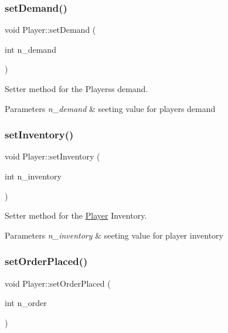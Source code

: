 \subsubsection{\texorpdfstring{set\+Demand()}{setDemand()}}
{\footnotesize\ttfamily void Player\+::set\+Demand (\begin{DoxyParamCaption}\item[{int}]{n\+\_\+demand }\end{DoxyParamCaption})}



Setter method for the Players\textquotesingle{}s demand. 


\begin{DoxyParams}{Parameters}
{\em n\+\_\+demand} & seeting value for player\textquotesingle{}s demand \\
\hline
\end{DoxyParams}
\mbox{\label{class_player_a279e316b279fcf5e78f395bea0f417f0}} 
\subsubsection{\texorpdfstring{set\+Inventory()}{setInventory()}}
{\footnotesize\ttfamily void Player\+::set\+Inventory (\begin{DoxyParamCaption}\item[{int}]{n\+\_\+inventory }\end{DoxyParamCaption})}



Setter method for the \hyperlink{class_player}{Player} Inventory. 


\begin{DoxyParams}{Parameters}
{\em n\+\_\+inventory} & seeting value for player inventory \\
\hline
\end{DoxyParams}
\mbox{\label{class_player_ab197bac4da8cbf646c6ffa36a16ad0b0}} 
\subsubsection{\texorpdfstring{set\+Order\+Placed()}{setOrderPlaced()}}
{\footnotesize\ttfamily void Player\+::set\+Order\+Placed (\begin{DoxyParamCaption}\item[{int}]{n\+\_\+order }\end{DoxyParamCaption})}



